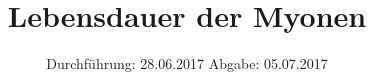

\subject{V01}
\title{Lebensdauer der Myonen}
\date{
  Durchführung: 28.06.2017
  \hspace{3em}
  Abgabe: 05.07.2017
}



\maketitle
\thispagestyle{empty}
\tableofcontents
\newpage






\printbibliography


